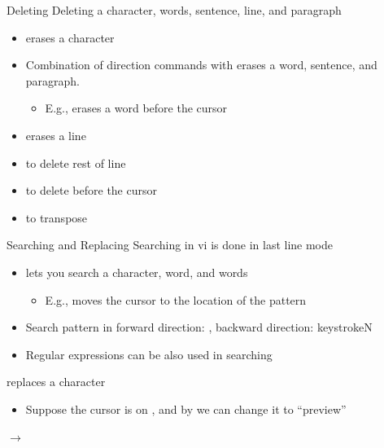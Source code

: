 \documentclass[newPxFont,sthlmFooter,nooffset]{beamer}
\begin{document}
\begin{frame}[t]{Deleting}
Deleting a character, words, sentence, line, and paragraph
\begin{itemize}
 \item {} erases a character
 \item Combination of direction commands with  erases a word, sentence, and paragraph.
\begin{itemize}
\item E.g.,  erases a word before the cursor
\end{itemize}
 \item {} erases a line
 \item {} to delete rest of line
 \item {} to delete before the cursor
 \item {} to transpose
\end{itemize}

\end{frame}



\begin{frame}[t]{Searching and Replacing}
Searching in vi is done in last line mode
\begin{itemize}
\item \keystrokered{/} lets you search a character, word, and words
\begin{itemize}
\item E.g.,  moves the cursor to the location of the pattern
\end{itemize}
\item Search pattern in forward direction: , backward direction: keystroke{N}
\item Regular expressions can be also used in searching
\end{itemize}
\bigskip

 replaces a character
\begin{itemize}
\item Suppose the cursor is on , and by   we can change it to “preview”
\end{itemize}
\begin{center}
 $\rightarrow$ 
\end{center}

\end{frame}
\end{document}
